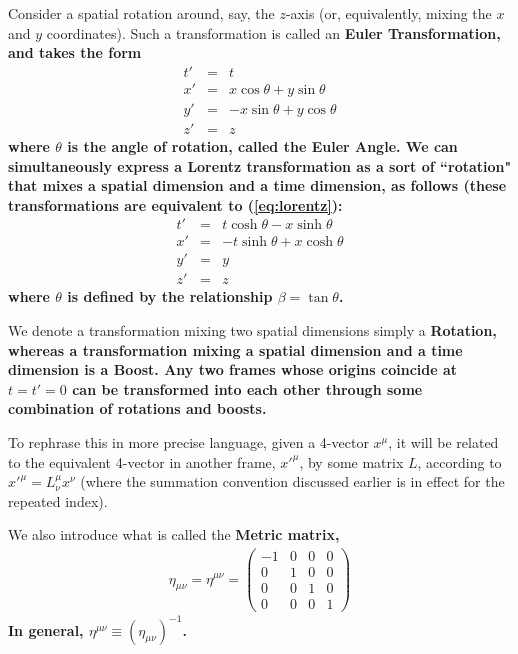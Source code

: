 \documentclass[12pt,epsf]{article}
\def\nolabel{\nonumber }
\def\nolabel{\nonumber }
\begin{document}
Consider a spatial rotation around, say, the $z$-axis (or, equivalently,
mixing the $x$ and $y$ coordinates).  Such a transformation is called
an \bf Euler Transformation\rm, and takes the form
\begin{eqnarray}
t' &=& t \nolabel \\
x' &=& x  \cos \theta + y \sin \theta \nolabel \\
y' &=& -x  \sin \theta + y \cos \theta \nolabel \\
z' &=& z \label{eq:lorrot}
\end{eqnarray}
where $\theta$ is the angle of rotation, called the \bf Euler Angle\rm.
 We can simultaneously express a Lorentz transformation as a sort of
``rotation" that mixes a spatial dimension and a time dimension, as follows
(these transformations are equivalent to (\ref{eq:lorentz}):
\begin{eqnarray}
t' &=& t  \cosh\theta - x  \sinh \theta \nolabel \\
x' &=& -t  \sinh \theta + x  \cosh \theta \nolabel \\
y' &=& y \nolabel \\
z' &=& z \label{eq:lorboost}
\end{eqnarray}
where $\theta$ is defined by the relationship $\beta = \tan \theta$.  

We denote a transformation mixing two spatial dimensions simply a \bf
Rotation\rm, whereas a transformation mixing a spatial dimension and a
time dimension is a \bf Boost\rm.  Any two frames whose origins
coincide at $t=t'=0$ can be transformed into each other through some
combination of rotations and boosts.  

To rephrase this in more precise language, given a 4-vector
$x^{\mu}$, it will be related to the equivalent 4-vector in another
frame, $x'^{\mu}$, by some matrix $L$, according to $x'^{\mu} =
L^{\mu}_{\nu}x^{\nu}$ (where the summation convention discussed earlier
is in effect for the repeated index).  

We also introduce what is called the \bf Metric \rm matrix,
\begin{eqnarray}
\eta_{\mu \nu} = \eta^{\mu \nu} = 
\begin{pmatrix}
-1 & 0 & 0 & 0 \\
0 & 1 & 0 & 0 \\
0 & 0 & 1 & 0 \\
0 & 0 & 0 & 1
\end{pmatrix} \nolabel
\end{eqnarray}
In general, $\eta^{\mu \nu} \equiv (\eta_{\mu \nu})^{-1}$.
\end{document}
